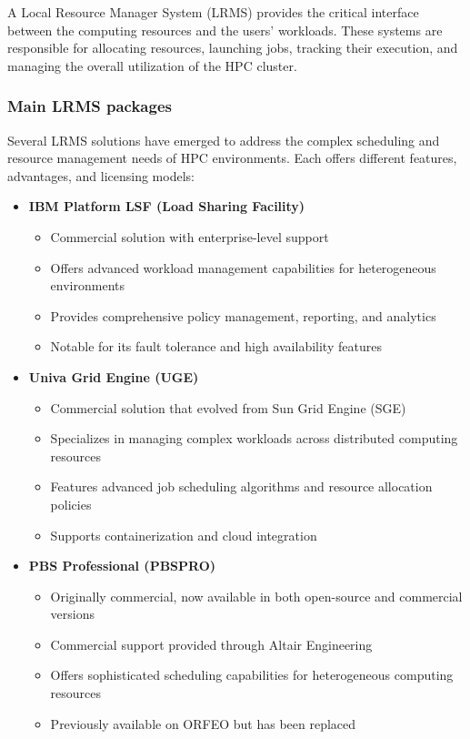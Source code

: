 A Local Resource Manager System (LRMS) provides the critical interface between the computing resources and the users' workloads. These systems are responsible for allocating resources, launching jobs, tracking their execution, and managing the overall utilization of the HPC cluster.

\subsubsection{Main LRMS packages}

Several LRMS solutions have emerged to address the complex scheduling and resource management needs of HPC environments. Each offers different features, advantages, and licensing models:

\begin{itemize}
    \item \textbf{IBM Platform LSF (Load Sharing Facility)}
    \begin{itemize}
        \item Commercial solution with enterprise-level support
        \item Offers advanced workload management capabilities for heterogeneous environments
        \item Provides comprehensive policy management, reporting, and analytics
        \item Notable for its fault tolerance and high availability features
    \end{itemize}
    
    \item \textbf{Univa Grid Engine (UGE)}
    \begin{itemize}
        \item Commercial solution that evolved from Sun Grid Engine (SGE)
        \item Specializes in managing complex workloads across distributed computing resources
        \item Features advanced job scheduling algorithms and resource allocation policies
        \item Supports containerization and cloud integration
    \end{itemize}
    
    \item \textbf{PBS Professional (PBSPRO)}
    \begin{itemize}
        \item Originally commercial, now available in both open-source and commercial versions
        \item Commercial support provided through Altair Engineering
        \item Offers sophisticated scheduling capabilities for heterogeneous computing resources
        \item Previously available on ORFEO but has been replaced
    \end{itemize}
    

\end{itemize}
